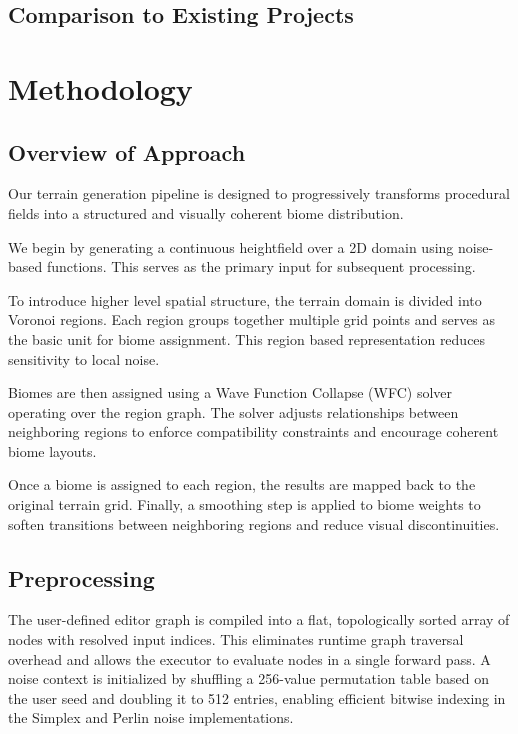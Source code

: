 \documentclass[12pt]{article}
\begin{document}
\subsection{Comparison to Existing Projects}


\section{Methodology}

\subsection{Overview of Approach}
Our terrain generation pipeline is designed to progressively transforms procedural fields into a structured and visually coherent biome distribution.

We begin by generating a continuous heightfield over a 2D domain using noise-based functions. This serves as the primary input for subsequent processing.

To introduce higher level spatial structure, the terrain domain is divided into Voronoi regions. Each region groups together multiple grid points and serves as the basic unit for biome assignment. This region based representation reduces sensitivity to local noise.

Biomes are then assigned using a Wave Function Collapse (WFC) solver operating over the region graph. The solver adjusts relationships between neighboring regions to enforce compatibility constraints and encourage coherent biome layouts.

Once a biome is assigned to each region, the results are mapped back to the original terrain grid. Finally, a smoothing step is applied to biome weights to soften transitions between neighboring regions and reduce visual discontinuities.

\subsection{Preprocessing}

The user-defined editor graph is compiled into a flat, topologically sorted array of nodes with resolved input indices. This eliminates runtime graph traversal overhead and allows the executor to evaluate nodes in a single forward pass. A noise context is initialized by shuffling a 256-value permutation table based on the user seed and doubling it to 512 entries, enabling efficient bitwise indexing in the Simplex and Perlin noise implementations.
\end{document}
